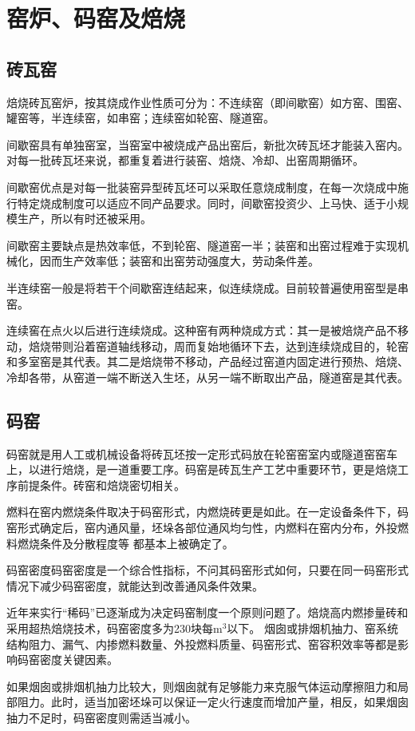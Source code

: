 \documentclass{ctexbook}
\begin{document}
\section{窑炉、码窑及焙烧}
\subsection{砖瓦窑}
焙烧砖瓦窑炉，按其烧成作业性质可分为：不连续窑（即间歇窑）如方窑、围窑、罐窑等，半连续窑，如串窑；连续窑如轮窑、隧道窑。

间歇窑具有单独窑室，当窑室中被烧成产品出窑后，新批次砖瓦坯才能装入窑内。对每一批砖瓦坯来说，都重复着进行装窑、焙烧、冷却、出窑周期循环。

间歇窑优点是对每一批装窑异型砖瓦坯可以采取任意烧成制度，在每一次烧成中施行特定烧成制度可以适应不同产品要求。同时，间歇窑投资少、上马快、适于小规模生产，所以有时还被采用。

间歇窑主要缺点是热效率低，不到轮窑、隧道窑一半；装窑和出窑过程难于实现机械化，因而生产效率低；装窑和出窑劳动强度大，劳动条件差。

半连续窑一般是将若干个间歇窑连结起来，似连续烧成。目前较普遍使用窑型是串窑。

连续窖在点火以后进行连续烧成。这种窑有两种烧成方式：其一是被焙烧产品不移动，焙烧带则沿着窑道轴线移动，周而复始地循环下去，达到连续烧成目的，轮窑和多室窑是其代表。其二是焙烧带不移动，产品经过窑道内固定进行预热、焙烧、冷却各带，从窑道一端不断送入生坯，从另一端不断取出产品，隧道窑是其代表。
\subsection{码窑}
码窑就是用人工或机械设备将砖瓦坯按一定形式码放在轮窑窑室内或隧道窑窑车上，以进行焙烧，是一道重要工序。码窑是砖瓦生产工艺中重要环节，更是焙烧工序前提条件。砖窑和焙烧密切相关。

燃料在窑内燃烧条件取决于码窑形式，内燃烧砖更是如此。在一定设备条件下，码窑形式确定后，窑内通风量，坯垛各部位通风均匀性，内燃料在窑内分布，外投燃料燃烧条件及分散程度等
都基本上被确定了。

码窑密度码窑密度是一个综合性指标，不问其码窑形式如何，只要在同一码窑形式情况下减少码窑密度，就能达到改善通风条件效果。

近年来实行“稀码”已逐渐成为决定码窑制度一个原则问题了。焙烧高内燃掺量砖和采用超热焙烧技术，码窑密度多为230块每m$^3$以下。
烟囱或排烟机抽力、窑系统结构阻力、漏气、内掺燃料数量、外投燃料质量、码窑形式、窑容积效率等都是影响码窑密度关键因素。

如果烟囱或排烟机抽力比较大，则烟囱就有足够能力来克服气体运动摩擦阻力和局部阻力。此时，适当加密坯垛可以保证一定火行速度而增加产量，相反，如果烟囱抽力不足时，码窑密度则需适当减小。
\end{document}

